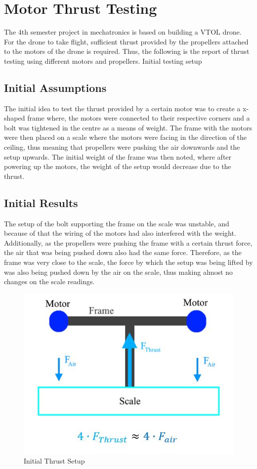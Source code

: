 \section{Motor Thrust Testing}
The 4th semester project in mechatronics is based on building a VTOL drone. For the drone to take flight, 
sufficient thrust provided by the propellers attached to the motors of the drone is required. Thus,
the following is the report of thrust testing using different motors and propellers.
Initial testing setup

\subsection{Initial Assumptions}
The initial idea to test the thrust provided by a certain motor was to create a x-shaped frame where, 
the motors were connected to their respective corners and a bolt was tightened in the centre as a means of weight. 
The frame with the motors were then placed on a scale where the motors were facing in the direction of the ceiling, 
thus meaning that propellers were pushing the air downwards and the setup upwards. The initial weight of the frame was then noted, 
where after powering up the motors, the weight of the setup would decrease due to the thrust. 

\subsection{Initial Results}
The setup of the bolt supporting the frame on the scale was unstable, and because of that the wiring of the motors had also
interfered with the weight. Additionally, as the propellers were pushing the frame with a certain thrust force, 
the air that was being pushed down also had the same force. Therefore, as the frame was very close to the scale, 
the force by which the setup was being lifted by was also being pushed down by the air on the scale, thus making almost no 
changes on the scale readings. 

\begin{figure}
    \includegraphics[width=\linewidth]{pictures/control/Motor thrust 1.jpg}
    \caption{Initial Thrust Setup}
    \label{fig:Initial Thrust Setup}

\end{figure}

